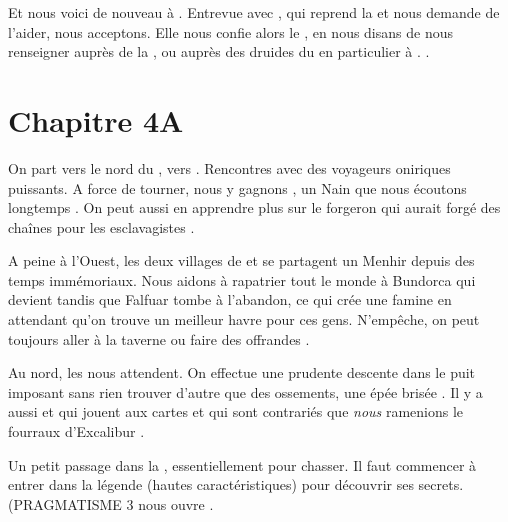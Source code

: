 \documentclass[11pt]{article}
\begin{document}

Et nous voici de nouveau à \newcamelot{}. Entrevue avec \morgane, qui reprend la \poupee{} et nous demande de l'aider, nous acceptons.  Elle nous confie alors le \fauxgraal{}, en nous disans de nous renseigner auprès de la \dame{}, ou auprès des druides du \cerclelunaire{} en particulier à \amergin{}. .

\section{Chapitre 4A}

On part vers le nord du \bourgpacif{}, vers \broch{} . Rencontres avec des voyageurs oniriques puissants. A force de tourner, nous y gagnons , un Nain que nous écoutons longtemps  . On peut aussi en apprendre plus sur le forgeron \morfran{} qui aurait forgé des chaînes pour les esclavagistes .

A peine à l'Ouest, les deux villages de \bundorca{} et \falfuar{} se partagent un Menhir depuis des temps immémoriaux. Nous aidons à rapatrier tout le monde à Bundorca qui devient \faldorca{} tandis que Falfuar tombe à l'abandon, ce qui crée une famine en attendant qu'on trouve un meilleur havre pour ces gens. N'empêche, on peut toujours aller à la taverne  ou faire des offrandes .

Au nord, les \tombesordre{} nous attendent. On effectue une prudente descente dans le puit imposant sans rien trouver d'autre que des ossements, une épée brisée \rich[1]. Il y a aussi \bedivere{} et \palamede{} qui jouent aux cartes et qui sont contrariés que \emph{nous} ramenions le fourraux d'Excalibur .


Un petit passage dans la \murmures{} , essentiellement pour chasser. Il faut commencer à entrer dans la légende (hautes caractéristiques) pour découvrir ses secrets. (PRAGMATISME 3 nous ouvre .
\end{document}
